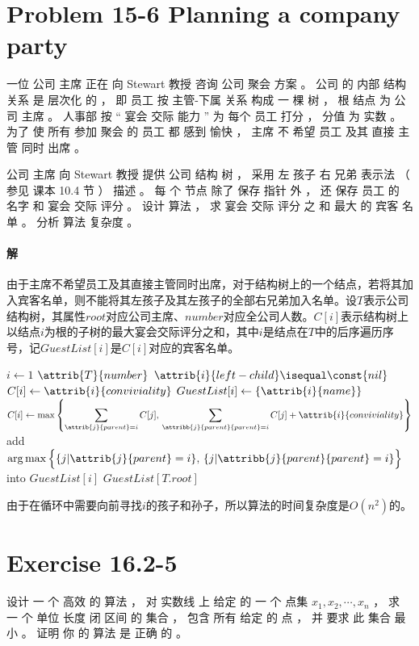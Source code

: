 \documentclass{article}
\begin{document}
\section{Problem 15-6 Planning a company party}
一位 公司 主席 正在 向 Stewart 教授 咨询 公司 聚会 方案 。 公司 的 内部 结构 关系 是 层次化 的 ， 即 员工 按 主管-下属 关系 构成 一 棵 树 ， 根 结点 为 公司 主席 。 人事部 按 “ 宴会 交际 能力 ” 为 每个 员工 打分 ， 分值 为 实数 。 为了 使 所有 参加 聚会 的 员工 都 感到 愉快 ， 主席 不 希望 员工 及其 直接 主管 同时 出席 。
\par
公司 主席 向 Stewart 教授 提供 公司 结构 树 ， 采用 左 孩子 右 兄弟 表示法 （ 参见 课本 10.4 节 ） 描述 。 每 个 节点 除了 保存 指针 外 ， 还 保存 员工 的 名字 和 宴会 交际 评分 。 设计 算法 ， 求 宴会 交际 评分 之 和 最大 的 宾客 名单 。 分析  算法 复杂度 。

\paragraph{解}
由于主席不希望员工及其直接主管同时出席，对于结构树上的一个结点，若将其加入宾客名单，则不能将其左孩子及其左孩子的全部右兄弟加入名单。设$T$表示公司结构树，其属性$root$对应公司主席、$number$对应全公司人数。$C[i]$表示结构树上以结点$i$为根的子树的最大宴会交际评分之和，其中$i$是结点在$T$中的后序遍历序号，记$GuestList[i]$是$C[i]$对应的宾客名单。
\begin{codebox}
	\li \For $i \gets 1$ \To $\attrib{T}{number}$
		\Do
	\li \If $\attrib{i}{left-child} \isequal \const{nil}$ \Then
	\li 	$C[i] \gets \attrib{i}{conviviality}$
	\li 	$GuestList[i] \gets \{ \attrib{i}{name} \}$
	\li \Else
	\li 	$C[i] \gets \max{\left \{\displaystyle \sum_{\attrib{j}{parent} = i}{C[j]},\,\sum_{\attribb{j}{parent}{parent} = i}{C[j]} + \attrib{i}{conviviality} \right \}}$
	\li 	add $\arg\max{\Big \{ \{j | \attrib{j}{parent} = i\},\,\{j | \attribb{j}{parent}{parent} = i\}\Big \}}$ into
	\zi		$GuestList[i]$
		\End
		\End
	\li \Return $GuestList[T.root]$
\end{codebox}
由于在循环中需要向前寻找$i$的孩子和孙子，所以算法的时间复杂度是$O(n^2)$的。

\section{Exercise 16.2-5}
设计 一 个 高效 的 算法 ， 对 实数线 上 给定 的 一 个 点集 ${x_1,x_2,\cdots,x_n}$ ， 求 一 个 单位 长度 闭 区间 的 集合 ， 包含 所有 给定 的 点 ， 并 要求 此 集合 最小 。 证明 你 的 算法 是 正确 的 。
\end{document}
